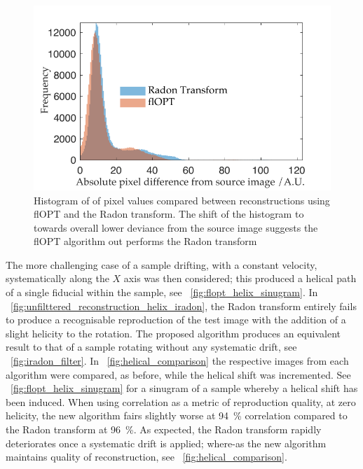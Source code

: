 \begin{figure}
  \centering
  \includegraphics{Chapters/flopt/Figs/PDF/results/flopt_histogram}
  \caption{Histogram of of pixel values compared between reconstructions using flOPT and the \gls{Radon transform}.
  The shift of the histogram to towards overall lower deviance from the source image suggests the flOPT algorithm out performs the \gls{Radon transform}}
  \label{fig:flopt_histogram}
\end{figure}


The more challenging case of a sample drifting, with a constant velocity, systematically along the \(X\) axis was then considered; this produced a helical path of a single fiducial within the sample, see \figurename~\ref{fig:flopt_helix_sinugram}.
In \figurename~\ref{fig:unfilttered_reconstruction_helix_iradon}, the \gls{Radon transform} entirely fails to produce a recognisable reproduction of the test image with the addition of a slight helicity to the rotation.
The proposed algorithm produces an equivalent result to that of a sample rotating without any systematic drift, see \figurename~\ref{fig:iradon_filter}.
In \figurename~\ref{fig:helical_comparison} the respective images from each algorithm were compared, as before, while the helical shift was incremented.
See \figurename~\ref{fig:flopt_helix_sinugram} for a \gls{sinugram} of a sample whereby a helical shift has been induced.
When using correlation as a metric of reproduction quality, at zero helicity, the new algorithm fairs slightly worse at \SI{94}{\percent} correlation compared to the \gls{Radon transform} at \SI{96}{\percent}.
As expected, the \gls{Radon transform} rapidly deteriorates once a systematic drift is applied; where-as the new algorithm maintains quality of reconstruction, see \figurename~\ref{fig:helical_comparison}.

